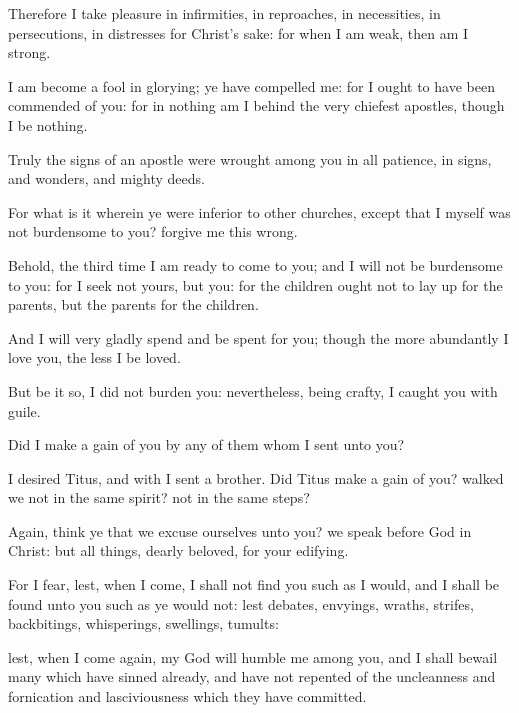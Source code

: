 {Therefore I take
pleasure
in
infirmities,
in
reproaches,
in
necessities,
in
persecutions,
in
distresses
for
Christ’s sake:
for
when I am
weak,
then am
I
strong.


\par }{\PP {}I am
become a
fool in
glorying;
ye have
compelled
me:
for
I
ought to have been
commended
of
you:
for in
nothing am I
behind the
very
chiefest
apostles,
though I
be
nothing.

Truly the
signs of an
apostle were
wrought
among
you
in
all
patience,
in
signs,
and
wonders,
and mighty
deeds.

For
what
is it
wherein ye were
inferior
to
other
churches,
except
{}
that
I
myself
was
not
burdensome to
you?
forgive
me
this
wrong.

Behold, the third
time I
am
ready to
come
to
you;
and I
will
not be
burdensome to
you:
for I
seek
not
yours,
but
you:
for the
children
ought
not to lay
up for the
parents,
but the
parents for the
children.

And
I will very
gladly
spend
and be
spent
for
you;
though the more
abundantly I
love
you, the
less I be
loved.

But be it
so,
I
did
not
burden
you:
nevertheless,
being
crafty, I
caught
you with
guile.

Did I make a
gain
of
you
by
any of
them
whom I
sent unto
you?

I
desired
Titus,
and
with
{} I
sent a
brother.
Did
Titus make a
gain of
you? walked
we
not in the
same
spirit?
{}
not in the
same
steps?

Again, think
ye
that we excuse
ourselves unto
you? we
speak
before
God
in
Christ:
but
{} all
things, dearly
beloved,
for
your
edifying.

For I
fear,
lest, when I
come, I
shall
not
find
you such
as I
would,
and
{}
I shall be
found unto
you such
as ye
would
not:
lest
{}
debates,
envyings,
wraths,
strifes,
backbitings,
whisperings,
swellings,
tumults:

lest, when I
come
again,
my
God will
humble
me
among
you,
and
{} I shall
bewail
many
which have sinned
already,
and
have
not
repented
of the
uncleanness
and
fornication
and
lasciviousness
which they have
committed.




\par }
